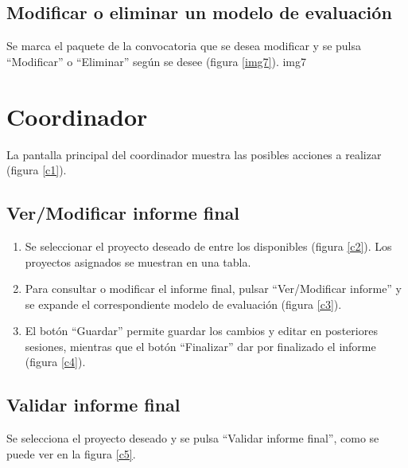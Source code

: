 \documentclass[11pt,a4paper,spanish,twoside]{book}
\begin{document}
\subsection{Modificar o eliminar un modelo de evaluación}
Se marca el paquete de la convocatoria que se desea modificar y se pulsa 
``Modificar'' o ``Eliminar'' según se desee (figura \ref{img7}).
{img7}

\section{Coordinador}
La pantalla principal del coordinador muestra las posibles acciones a realizar 
(figura \ref{c1}).

\subsection{Ver/Modificar informe final}
\begin{enumerate}
\item Se seleccionar el proyecto deseado de entre los disponibles (figura 
  \ref{c2}). Los proyectos asignados se muestran en una tabla.
  

\item Para consultar o modificar el informe final, pulsar 
  ``Ver/Modificar informe'' y se expande el correspondiente modelo de 
  evaluación (figura \ref{c3}).


\item El botón ``Guardar'' permite guardar los cambios y editar en 
  posteriores sesiones, mientras que el botón ``Finalizar'' dar por finalizado 
  el informe (figura \ref{c4}).
  
\end{enumerate}

\subsection{Validar informe final}
Se selecciona el proyecto deseado y se pulsa ``Validar informe final'', como se 
puede ver en la figura \ref{c5}.
\end{document}
